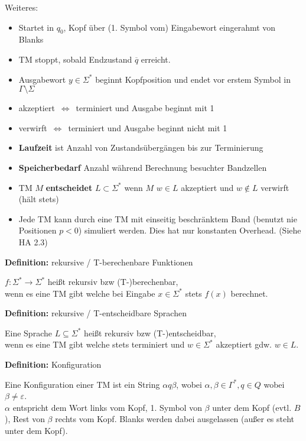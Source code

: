 \documentclass[a4paper,graphics,11pt]{article}
\newcommand{\eps}[0]{\varepsilon}
\newcommand{\Iff}[0]{\,\Longleftrightarrow\,}
\begin{document}
Weiteres:
\begin{itemize}
    \item Startet in $q_0$, Kopf über (1. Symbol vom) Eingabewort eingerahmt von Blanks
    \item TM stoppt, sobald Endzustand $\overline{q}$ erreicht.
    \item Ausgabewort $y \in \Sigma^*$ beginnt Kopfposition und endet vor erstem Symbol in $\Gamma\setminus\Sigma$
    \\
    \item akzeptiert $\Iff$ terminiert und Ausgabe beginnt mit 1
    \item verwirft $\Iff$ terminiert und Ausgabe beginnt nicht mit 1
    \\
    \item \textbf{Laufzeit} ist Anzahl von Zustandsübergängen bis zur Terminierung
    \item \textbf{Speicherbedarf} Anzahl während Berechnung besuchter Bandzellen 
    \\
    \item TM $M$ \textbf{entscheidet} $L \subset \Sigma^*$ wenn $M$ $w \in L$ akzeptiert und $w \notin L$ verwirft
        (hält stets)
    \\
    \item Jede TM kann durch eine TM mit einseitig beschränktem Band (benutzt nie Positionen $p<0$) simuliert werden.
        Dies hat nur konstanten Overhead. (Siehe HA 2.3)
\end{itemize}
\strut

\textbf{Definition:} rekursive / T-berechenbare Funktionen

$f : \Sigma^* \to \Sigma^*$ heißt rekursiv bzw (T-)berechenbar,\\
wenn es eine TM gibt welche bei Eingabe $x \in \Sigma^*$ stets $f(x)$ berechnet.

\strut
\textbf{Definition:} rekursive / T-entscheidbare Sprachen

Eine Sprache $L \subseteq \Sigma^*$ heißt rekursiv bzw (T-)entscheidbar,\\
wenn es eine TM gibt welche stets terminiert und $w \in \Sigma^*$ akzeptiert gdw. $w \in L$.

\newpage

\textbf{Definition:} Konfiguration

Eine Konfiguration einer TM ist ein String $\alpha q \beta$, wobei $\alpha,\beta \in \Gamma^*,q \in Q$
wobei $\beta \neq \eps$.\\
$\alpha$ entspricht dem Wort links vom Kopf, 1. Symbol von $\beta$ unter dem Kopf (evtl. $B$), Rest von $\beta$ rechts vom Kopf. Blanks werden dabei ausgelassen (außer es steht unter
dem Kopf).
\end{document}
